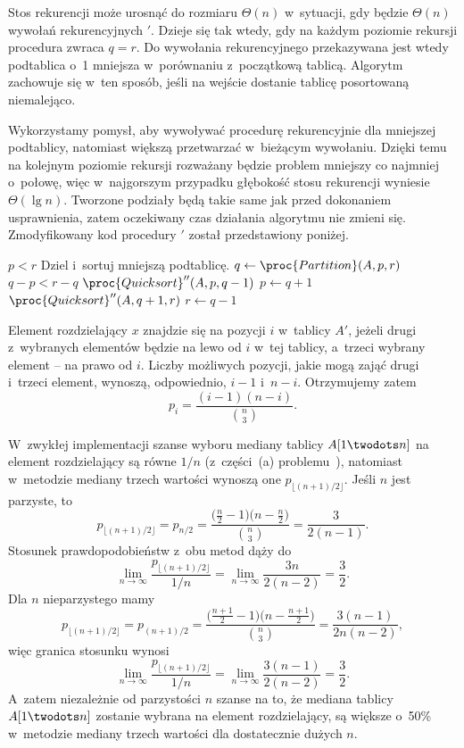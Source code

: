 \subproblem %
Stos rekurencji może urosnąć do rozmiaru $\Theta(n)$ w~sytuacji, gdy będzie $\Theta(n)$ wywołań rekurencyjnych $'$. Dzieje się tak wtedy, gdy na każdym poziomie rekursji procedura  zwraca $q=r$. Do wywołania rekurencyjnego przekazywana jest wtedy podtablica o~1 mniejsza w~porównaniu z~początkową tablicą. Algorytm zachowuje się w~ten sposób, jeśli na wejście dostanie tablicę posortowaną niemalejąco.

\subproblem %
Wykorzystamy pomysł, aby wywoływać procedurę rekurencyjnie dla mniejszej podtablicy, natomiast większą przetwarzać w~bieżącym wywołaniu. Dzięki temu na kolejnym poziomie rekursji rozważany będzie problem mniejszy co najmniej o~połowę, więc w~najgorszym przypadku głębokość stosu rekurencji wyniesie $\Theta(\lg n)$. Tworzone podziały będą takie same jak przed dokonaniem usprawnienia, zatem oczekiwany czas działania algorytmu nie zmieni się. Zmodyfikowany kod procedury $'$ został przedstawiony poniżej.
\begin{codebox}
\li	\While $p<r$
\li		\Do
			\Comment Dziel i~sortuj mniejszą podtablicę.
\li			$q\gets\proc{Partition}(A,p,r)$
\li			\If $q-p<r-q$
\li				\Then
					$\proc{Quicksort}''(A,p,q-1)$
\li					$p\gets q+1$
\li				\Else
					$\proc{Quicksort}''(A,q+1,r)$
\li					$r\gets q-1$
				\End
		\End
\end{codebox}


\subproblem %
Element rozdzielający $x$ znajdzie się na pozycji $i$ w~tablicy $A'$, jeżeli drugi z~wybranych elementów będzie na lewo od $i$ w~tej tablicy, a~trzeci wybrany element -- na prawo od $i$. Liczby możliwych pozycji, jakie mogą zająć drugi i~trzeci element, wynoszą, odpowiednio, $i-1$ i~$n-i$. Otrzymujemy zatem
\[
	p_i = \frac{(i-1)(n-i)}{\binom{n}{3}}.
\]

\subproblem %
W~zwykłej implementacji szanse wyboru mediany tablicy $A[1\twodots n]$ na element rozdzielający są równe $1/n$ (z~części~(a) problemu~), natomiast w~metodzie mediany trzech wartości wynoszą one $p_{\lfloor(n+1)/2\rfloor}$. Jeśli $n$ jest parzyste, to
\[
	p_{\lfloor(n+1)/2\rfloor} = p_{n/2} = \frac{\bigl(\frac{n}{2}-1\bigr)\bigl(n-\frac{n}{2}\bigr)}{\binom{n}{3}} = \frac{3}{2(n-1)}.
\]
Stosunek prawdopodobieństw z~obu metod dąży do
\[
    \lim_{n\to\infty}\frac{p_{\lfloor(n+1)/2\rfloor}}{1/n} = \lim_{n\to\infty}\frac{3n}{2(n-2)} = \frac{3}{2}.
\]
Dla $n$ nieparzystego mamy
\[
	p_{\lfloor(n+1)/2\rfloor} = p_{(n+1)/2} = \frac{\bigl(\frac{n+1}{2}-1\bigr)\bigl(n-\frac{n+1}{2}\bigr)}{\binom{n}{3}} = \frac{3(n-1)}{2n(n-2)},
\]
więc granica stosunku wynosi
\[
    \lim_{n\to\infty}\frac{p_{\lfloor(n+1)/2\rfloor}}{1/n} = \lim_{n\to\infty}\frac{3(n-1)}{2(n-2)} = \frac{3}{2}.
\]
A~zatem niezależnie od parzystości $n$ szanse na to, że mediana tablicy $A[1\twodots n]$ zostanie wybrana na element rozdzielający, są większe o~50\% w~metodzie mediany trzech wartości dla dostatecznie dużych $n$.

